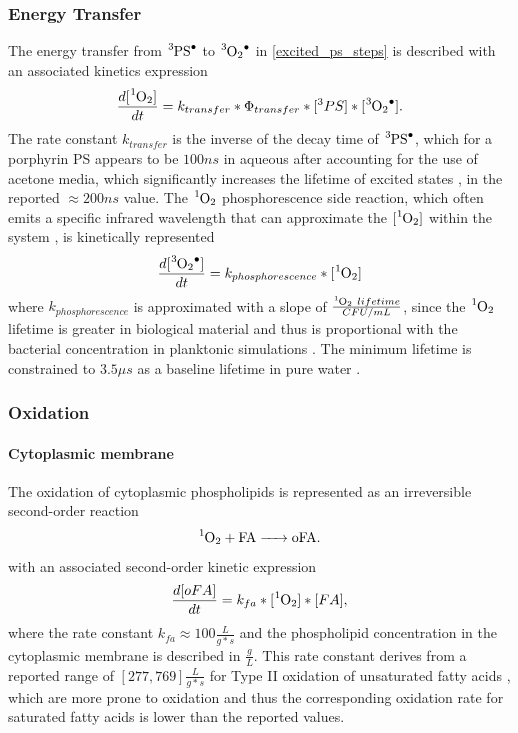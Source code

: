 \subsubsection*{Energy Transfer}
The energy transfer from $\ce{^3PS^.}$ to $\ce{^3O2^.}$  in \cref{excited_ps_steps} is described with an associated kinetics expression
\begin{equation} \label{energy_transfer_kinetics}
    \frac{d[\ce{^1O2}]}{dt} = k_{transfer}*\Phi_{transfer}*[^3PS]*[\ce{^3O2^.}]. 
\end{equation}
The rate constant $k_{transfer}$ is the inverse of the decay time of $\ce{^3PS^.}$, which for a porphyrin PS appears to be $100 ns$ in aqueous after accounting for the use of acetone media, which significantly increases the lifetime of excited states \cite{Spikes1992QuantumUroporphyrin}, in the reported $\approx 200 ns$ \cite{Kupper2002KineticsOxygen} value. The $\ce{^1O2}$ phosphorescence side reaction, which often emits a specific infrared wavelength that can approximate the $[\ce{^1O2}]$ within the system \cite{Macpherson1993DirectCentres}, is kinetically represented 
\begin{equation}
    \frac{d[\ce{^3O2^.}]}{dt} = k_{phosphorescence}*[\ce{^1O2}]
\end{equation}
where $k_{phosphorescence}$ is approximated with a slope of $\frac{\ce{^1O2}~lifetime}{CFU/mL}$, since the $\ce{^1O2}$ lifetime is greater in biological material and thus is proportional with the bacterial concentration in planktonic simulations \cite{Maisch2007TheBacteria}. The minimum lifetime is constrained to $3.5\mu s$ as a baseline lifetime in pure water \cite{Baier2005Time-resolvedCells}.

\subsubsection*{Oxidation}

\paragraph{Cytoplasmic membrane} 
The oxidation of cytoplasmic phospholipids is represented as an irreversible second-order reaction \cite{Watabe2007OxidationMembranes.}
\begin{equation} \label{membrane_oxidation}
    \ce{^1O2 + FA -> oFA}.
\end{equation}
with an associated second-order kinetic expression
\begin{equation} \label{membrane_oxidation_kinetics}
    \frac{d[oFA]}{dt} = k_{fa}*[\ce{^1O2}]*[FA],
\end{equation}
where the rate constant $k_{fa} \approx 100 \frac{L}{g*s}$ and the phospholipid concentration in the cytoplasmic membrane is described in $\frac{g}{L}$. This rate constant derives from a reported range of $[277,769] \frac{L}{g*s}$ for Type II oxidation of unsaturated fatty acids \cite{Mukai2019KineticSolution}, which are more prone to oxidation and thus the corresponding oxidation rate for saturated fatty acids is lower than the reported values. 

